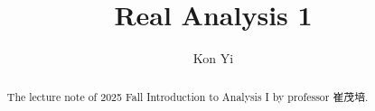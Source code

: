 \documentclass[a4paper]{report}
\author{Kon Yi}
\title{Real Analysis 1}
\begin{document}
\maketitle

\begin{abstract}
    The lecture note of 2025 Fall Introduction to Analysis I by professor 崔茂培.
\end{abstract}

\newpage

\tableofcontents


\newpage
\appendix
\appendixpage{}



\newpage
\pagestyle{plain}
\printbibliography{}
\end{document}
